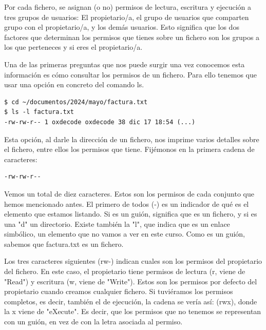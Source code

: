 Por cada fichero, se asignan (o no) permisos de lectura, escritura y ejecución a tres grupos de usuarios: El propietario/a, el grupo de usuarios que comparten grupo con el propietario/a, y los demás usuarios. Esto significa que los dos factores que determinan los permisos que tienes sobre un fichero son los grupos a los que perteneces y si eres el propietario/a.

Una de las primeras preguntas que nos puede surgir una vez conocemos esta información es cómo consultar los permisos de un fichero. Para ello tenemos que usar una opción en concreto del comando ls.

\begin{tcolorbox-code}
\begin{lstlisting}
$ cd ~/documentos/2024/mayo/factura.txt
$ ls -l factura.txt
-rw-rw-r-- 1 oxdecode oxdecode 38 dic 17 18:54 (...)
\end{lstlisting}
\end{tcolorbox-code}

Esta opción, al darle la dirección de un fichero, nos imprime varios detalles sobre el fichero, entre ellos los permisos que tiene. Fijémonos en la primera cadena de caracteres:

\begin{tcolorbox-code}
\begin{lstlisting}
-rw-rw-r--
\end{lstlisting}
\end{tcolorbox-code}

Vemos un total de diez caracteres. Estos son los permisos de cada conjunto que hemos mencionado antes. El primero de todos (-) es un indicador de qué es el elemento que estamos listando. Si es un guión, significa que es un fichero, y si es una "d" un directorio. Existe también la "l", que indica que es un enlace simbólico, un elemento que no vamos a ver en este curso. Como es un guión, sabemos que factura.txt es un fichero. 

Los tres caracteres siguientes (rw-) indican cuales son los permisos del propietario del fichero. En este caso, el propietario tiene permisos de lectura (r, viene de "Read") y escritura (w, viene de "Write"). Estos son los permisos por defecto del propietario cuando creamos cualquier fichero. Si tuviéramos los permisos completos, es decir, también el de ejecución, la cadena se vería así: (rwx), donde la x viene de "eXecute". Es decir, que los permisos que no tenemos se representan con un guión, en vez de con la letra asociada al permiso.


